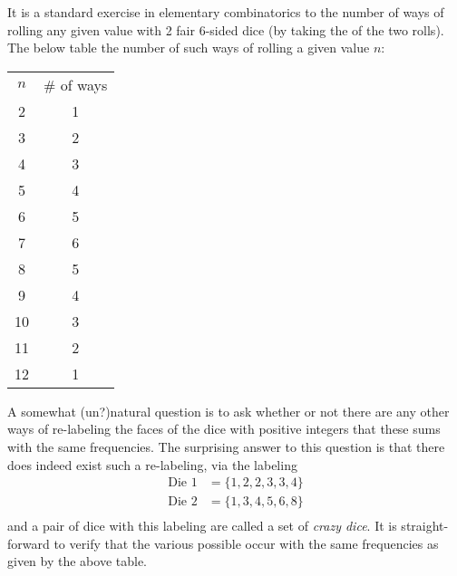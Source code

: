\documentclass[12pt]{article}
\newcommand{\<}{\langle}
\renewcommand{\>}{\rangle}
\begin{document}
It is a standard exercise in elementary combinatorics to  the number of ways of rolling any given value with 2 fair 6-sided dice (by taking the  of the two rolls).  The below table  the number of such ways of rolling a given value $n$:

\begin{center}
\begin{tabular}{|c|c|}\hline
$n$&\# of ways\\
2&1\\
3&2\\
4&3\\
5&4\\
6&5\\
7&6\\
8&5\\
9&4\\
10&3\\
11&2\\
12&1\\
\end{tabular}
\end{center}

A somewhat (un?)natural question is to ask whether or not there are any other ways of re-labeling the faces of the dice with positive integers that  these sums with the same frequencies.  The surprising answer to this question is that there does indeed exist such a re-labeling, via the labeling
\begin{align*}
\mbox{Die }1&=\{1,2,2,3,3,4\}\\
\mbox{Die }2&=\{1,3,4,5,6,8\}\\
\end{align*}
and a pair of dice with this labeling are called a set of \emph{crazy dice}.  It is straight-forward to verify that the various possible  occur with the same frequencies as given by the above table.
\end{document}
